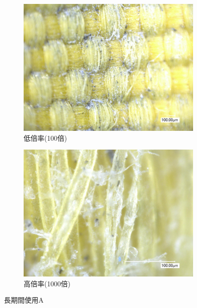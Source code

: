 \documentclass[main]{subfiles}
\begin{document}
\begin{figure}[H]
    \centering
    \begin{subfigure}[htbp]{0.45\linewidth}
        \centering
        \includegraphics[keepaspectratio, width=0.8\linewidth]{figures/縁/カーリングパッド長期低倍率.jpg}
        \caption{低倍率(100倍)}
        \label{fig:label}
    \end{subfigure}
    \begin{subfigure}[htbp]{0.45\linewidth}
        \centering
        \includegraphics[keepaspectratio, width=0.8\linewidth]{figures/縁/カーリングパッド長期.jpg}
        \caption{高倍率(1000倍)}
        \label{fig:label}
    \end{subfigure}
    \caption{長期間使用A}
    \label{fig:4}
\end{figure}
    
\end{document}
